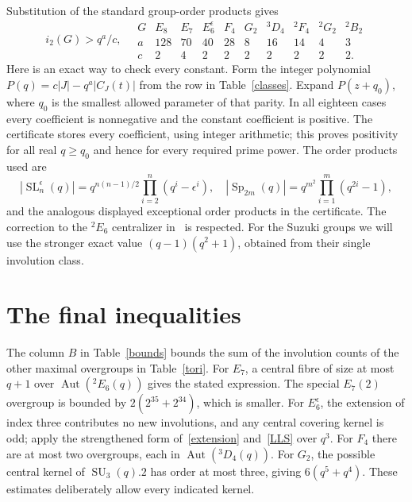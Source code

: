 \documentclass[10pt,a4paper]{article}
\newcommand{\Aut}{\operatorname{Aut}}
\newcommand{\Sp}{\operatorname{Sp}}\newcommand{\SL}{\operatorname{SL}}
\begin{document}
Substitution of the standard group-order products gives
\begin{equation}\label{lower}
 i_2(G)>q^a/c,
 \quad
\begin{array}{c|rrrrrrrrr}
G&E_8&E_7&E_6^\epsilon&F_4&G_2&{}^3D_4&{}^2F_4&{}^2G_2&{}^2B_2\\\hline
a&128&70&40&28&8&16&14&4&3\\
c&2&4&2&2&2&2&2&2&2.
\end{array}
\end{equation}
Here is an exact way to check every constant. Form the integer polynomial
$P(q)=c|J|-q^a|C_J(t)|$ from the row in Table~\ref{classes}. Expand
$P(z+q_0)$, where $q_0$ is the smallest allowed parameter of that parity.
In all eighteen cases every coefficient is nonnegative and the constant
coefficient is positive. The certificate stores every coefficient, using
integer arithmetic; this proves positivity for all real $q\ge q_0$ and
hence for every required prime power. The order products used are
\[
 |\SL_n^\epsilon(q)|=q^{n(n-1)/2}\prod_{i=2}^n(q^i-\epsilon^i),
 \quad |\Sp_{2m}(q)|=q^{m^2}\prod_{i=1}^m(q^{2i}-1),
\]
and the analogous displayed exceptional order products in the certificate.
The correction to the ${}^2E_6$ centralizer in~\cite{ASerr} is respected.
For the Suzuki groups we will use the stronger exact value
$(q-1)(q^2+1)$, obtained from their single involution class.

\section{The final inequalities}

The column $B$ in Table~\ref{bounds} bounds the sum of the involution
counts of the other maximal overgroups in Table~\ref{tori}.
For $E_7$, a central fibre of size at most $q+1$ over
$\Aut({}^2E_6(q))$ gives the stated expression. The special $E_7(2)$
overgroup is bounded by $2(2^{35}+2^{34})$, which is smaller.
For $E_6^\epsilon$, the extension of index three contributes no new
involutions, and any central covering kernel is odd; apply the strengthened
form of~\eqref{extension} and~\eqref{LLS} over $q^3$.
For $F_4$ there are at most two overgroups, each in
$\Aut({}^3D_4(q))$. For $G_2$, the possible central kernel of
$\operatorname{SU}_3(q).2$ has order at most three, giving
$6(q^5+q^4)$. These estimates deliberately allow every indicated kernel.
\end{document}
